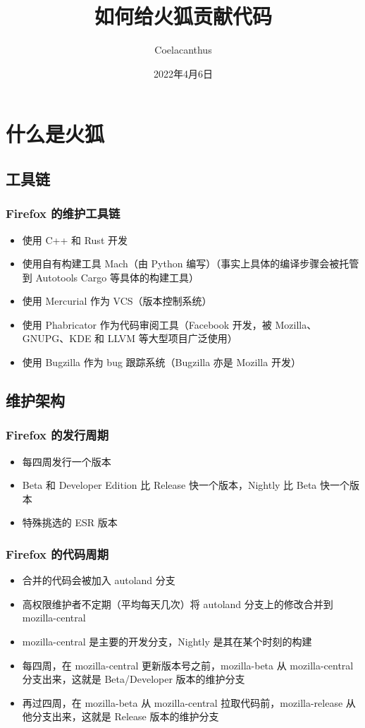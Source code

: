 \documentclass[UTF-8]{ctexbeamer}
\title{如何给火狐贡献代码}
\author{Coelacanthus}
\institute{PLCT Arch RISC-V 小队}
\date{2022年4月6日}
\begin{document}
\frame{\titlepage}

\section{什么是火狐}
\subsection{工具链}
\begin{frame}
	\frametitle{Firefox 的维护工具链}

	\begin{itemize}%
		\item 使用 C++ 和 Rust 开发
		\item 使用自有构建工具 Mach（由 Python 编写）（事实上具体的编译步骤会被托管到 Autotools Cargo 等具体的构建工具）
		\item 使用 Mercurial 作为 VCS（版本控制系统）
		\item 使用 Phabricator 作为代码审阅工具（Facebook 开发，被 Mozilla、GNUPG、KDE 和 LLVM 等大型项目广泛使用）
		\item 使用 Bugzilla 作为 bug 跟踪系统（Bugzilla 亦是 Mozilla 开发）
	\end{itemize}

\end{frame}

\subsection{维护架构}
\begin{frame}
	\frametitle{Firefox 的发行周期}

	\begin{itemize}
		\item 每四周发行一个版本
		\item Beta 和 Developer Edition 比 Release 快一个版本，Nightly 比 Beta 快一个版本
		\item 特殊挑选的 ESR 版本
	\end{itemize}

\end{frame}

\begin{frame}
	\frametitle{Firefox 的代码周期}

	\begin{itemize}
		\item 合并的代码会被加入 autoland 分支
		\item 高权限维护者不定期（平均每天几次）将 autoland 分支上的修改合并到 mozilla-central
		\item mozilla-central 是主要的开发分支，Nightly 是其在某个时刻的构建
		\item 每四周，在 mozilla-central 更新版本号之前，mozilla-beta 从 mozilla-central 分支出来，这就是 Beta/Developer 版本的维护分支
		\item 再过四周，在 mozilla-beta 从 mozilla-central 拉取代码前，mozilla-release 从他分支出来，这就是 Release 版本的维护分支
	\end{itemize}

\end{frame}
\end{document}
